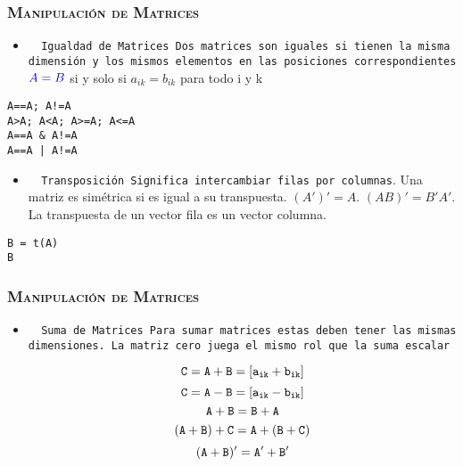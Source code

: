 \documentclass[16.5pt]{beamer}
\begin{document}
{
\begin{frame}
\frametitle{\textsc{\textbf{Manipulación de Matrices}}}
\hspace*{-5mm}
\vspace*{-5mm} 
\vspace{0.3cm}

\begin{itemize}
\item \texttt{ {\color{blue} Igualdad de Matrices} Dos matrices son iguales si tienen la misma dimensión y los mismos elementos en las posiciones correspondientes  }
$\color{blue} A= B$ si y solo si $a_{ik}= b_{ik}$ para todo i y k

\end{itemize}

\begin{lstlisting}
A==A; A!=A
A>A; A<A; A>=A; A<=A
A==A & A!=A
A==A | A!=A
\end{lstlisting}
\begin{itemize}
\item \texttt{ {\color{blue} Transposición} Significa intercambiar filas por columnas}. Una matriz es simétrica si es igual a su transpuesta. $(A')'=A$. $(AB)' = B'A'$. La transpuesta de un vector fila es un vector columna.
\end{itemize}
\begin{lstlisting}
B = t(A)
B
\end{lstlisting}

\end{frame}
}


{
\begin{frame}
\frametitle{\textsc{\textbf{Manipulación de Matrices}}}
\hspace*{-5mm}
\vspace*{-5mm} 
\vspace{0.3cm}

\begin{itemize}
\item \texttt{ {\color{blue} Suma de Matrices} Para sumar matrices estas deben tener las mismas dimensiones. La matriz cero juega el mismo rol que la suma escalar}

$$\color{black} \mathtt{C = A + B=[a_{ik} + b_{ik}]}$$
$$\color{black} \mathtt{C = A - B =[a_{ik} - b_{ik}]}$$
$$\color{black} \mathtt{A + B= B + A}$$
$$\color{black} \mathtt{(A + B) + C= A +(B + C)}$$
$$\color{black} \mathtt{(A + B)'= A' +B'}$$


\end{itemize}
\end{frame}
}
\end{document}
